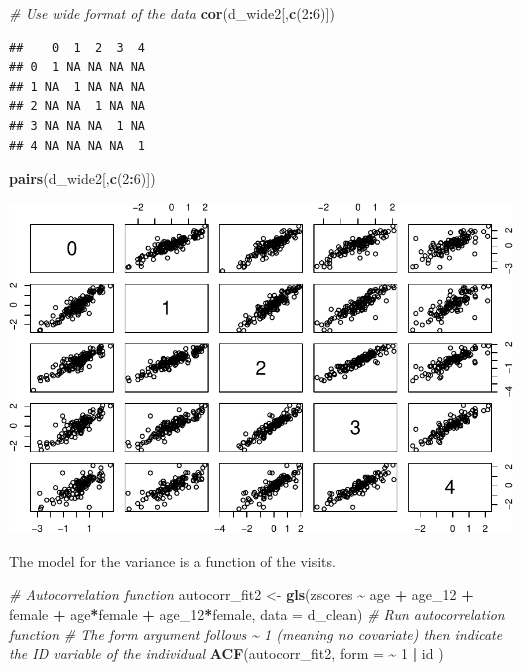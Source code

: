 \documentclass[
]{article}
\newenvironment{Shaded}{\begin{snugshade}}{\end{snugshade}}
\newcommand{\AttributeTok}[1]{\textcolor[rgb]{0.13,0.29,0.53}{#1}}
\newcommand{\CommentTok}[1]{\textcolor[rgb]{0.56,0.35,0.01}{\textit{#1}}}
\newcommand{\DecValTok}[1]{\textcolor[rgb]{0.00,0.00,0.81}{#1}}
\newcommand{\FunctionTok}[1]{\textcolor[rgb]{0.13,0.29,0.53}{\textbf{#1}}}
\newcommand{\NormalTok}[1]{#1}
\newcommand{\OtherTok}[1]{\textcolor[rgb]{0.56,0.35,0.01}{#1}}
\newcommand{\SpecialCharTok}[1]{\textcolor[rgb]{0.81,0.36,0.00}{\textbf{#1}}}
\begin{document}
\begin{Shaded}
\begin{Highlighting}[]
\CommentTok{\# Use wide format of the data}
\FunctionTok{cor}\NormalTok{(d\_wide2[,}\FunctionTok{c}\NormalTok{(}\DecValTok{2}\SpecialCharTok{:}\DecValTok{6}\NormalTok{)])}
\end{Highlighting}
\end{Shaded}

\begin{verbatim}
##    0  1  2  3  4
## 0  1 NA NA NA NA
## 1 NA  1 NA NA NA
## 2 NA NA  1 NA NA
## 3 NA NA NA  1 NA
## 4 NA NA NA NA  1
\end{verbatim}

\begin{Shaded}
\begin{Highlighting}[]
\FunctionTok{pairs}\NormalTok{(d\_wide2[,}\FunctionTok{c}\NormalTok{(}\DecValTok{2}\SpecialCharTok{:}\DecValTok{6}\NormalTok{)])}
\end{Highlighting}
\end{Shaded}

\includegraphics{ProblemSet3_ts_1677791812_files/figure-latex/unnamed-chunk-14-1.pdf}

The model for the variance is a function of the visits.

\begin{Shaded}
\begin{Highlighting}[]
\CommentTok{\# Autocorrelation function}
\NormalTok{autocorr\_fit2 }\OtherTok{\textless{}{-}} \FunctionTok{gls}\NormalTok{(zscores }\SpecialCharTok{\textasciitilde{}}\NormalTok{ age }\SpecialCharTok{+}\NormalTok{ age\_12 }\SpecialCharTok{+}\NormalTok{ female }\SpecialCharTok{+}\NormalTok{ age}\SpecialCharTok{*}\NormalTok{female }\SpecialCharTok{+}\NormalTok{ age\_12}\SpecialCharTok{*}\NormalTok{female, }\AttributeTok{data =}\NormalTok{ d\_clean)}
\CommentTok{\# Run autocorrelation function}
\CommentTok{\# The form argument follows \textasciitilde{} 1 (meaning no covariate) then indicate the ID variable of the individual}
\FunctionTok{ACF}\NormalTok{(autocorr\_fit2, }\AttributeTok{form =} \SpecialCharTok{\textasciitilde{}}   \DecValTok{1} \SpecialCharTok{|}\NormalTok{ id )}
\end{Highlighting}
\end{Shaded}
\end{document}
